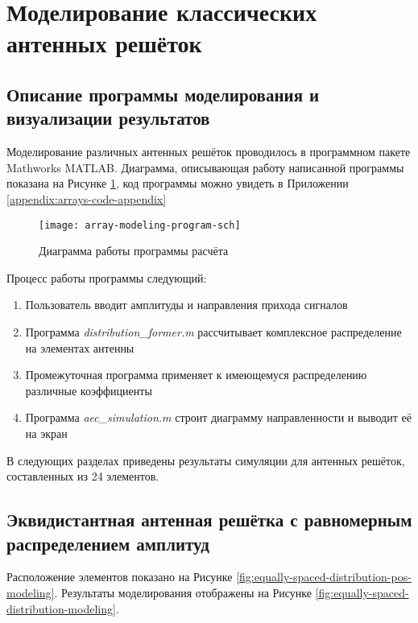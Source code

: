 \section{Моделирование классических антенных решёток}\label{sect:distributions-modeling}

\subsection{Описание программы моделирования и визуализации результатов}\label{sect:distributions-modeling-program}

Моделирование различных антенных решёток проводилось в программном пакете Mathworks MATLAB. Диаграмма, описывающая 
работу написанной программы показана на Рисунке \ref{fig:array-modeling-program-sch}, 
код программы можно увидеть в Приложении \ref{appendix:arrays-code-appendix}

\begin{figure}[!ht]
    \centering
    \texttt{[image: array-modeling-program-sch]}
    \caption{Диаграмма работы программы расчёта}%
    \label{fig:array-modeling-program-sch}
\end{figure}

Процесс работы программы следующий:

\begin{enumerate}
    \item Пользователь вводит амплитуды и направления прихода сигналов
    \item Программа \textit{distribution\_former.m} рассчитывает комплексное распределение на элементах антенны
    \item Промежуточная программа применяет к имеющемуся распределению различные коэффициенты 
    \item Программа \textit{aec\_simulation.m} строит диаграмму направленности и выводит её на экран
\end{enumerate}

В следующих разделах приведены результаты симуляции для антенных решёток, составленных из 24 элементов.

\subsection{Эквидистантная антенная решётка с равномерным распределением амплитуд}

Расположение элементов показано на Рисунке \ref{fig:equally-spaced-distribution-pos-modeling}. Результаты моделирования отображены на Рисунке \ref{fig:equally-spaced-distribution-modeling}.


